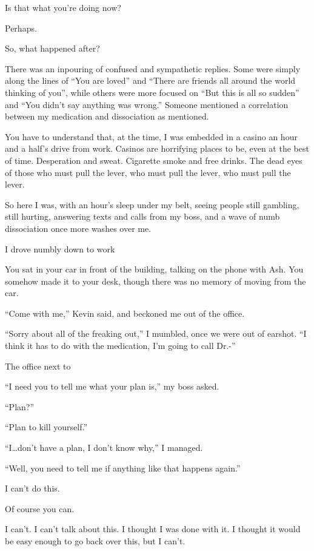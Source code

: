 \begin{paracol}{2}
\begin{leftcolumn}
\begin{ally}
Is that what you're doing now?
\end{ally}
Perhaps.
\newpage

\begin{ally}
So, what happened after?
\end{ally}
There was an inpouring of confused and sympathetic replies. Some were simply along the lines of ``You are loved'' and ``There are friends all around the world thinking of you'', while others were more focused on ``But this is all so sudden'' and ``You didn't say anything was wrong.'' Someone mentioned a correlation between my medication and dissociation as mentioned.

You have to understand that, at the time, I was embedded in a casino an hour and a half's drive from work. Casinos are horrifying places to be, even at the best of time. Desperation and sweat. Cigarette smoke and free drinks. The dead eyes of those who must pull the lever, who must pull the lever, who must pull the lever.

So here I was, with an hour's sleep under my belt, seeing people still gambling, still hurting, answering texts and calls from my boss, and a wave of numb dissociation once more washes over me.

I drove numbly down to work

\begin{ally}
You sat in your car in front of the building, talking on the phone with Ash. You somehow made it to your desk, though there was no memory of moving from the car.
\end{ally}
``Come with me,'' Kevin said, and beckoned me out of the office.

``Sorry about all of the freaking out,'' I mumbled, once we were out of earshot. ``I think it has to do with the medication, I'm going to call Dr.-''

\begin{ally}
The office next to
\end{ally}
``I need you to tell me what your plan is,'' my boss asked.

``Plan?''

``Plan to kill yourself.''

``I\ldots{}don't have a plan, I don't know why,'' I managed.

``Well, you need to tell me if anything like that happens again.''
\newpage

\noindent I can't do this.

\begin{ally}
Of course you can.
\end{ally}
I can't. I can't talk about this. I thought I was done with it. I thought it would be easy enough to go back over this, but I can't.


\end{leftcolumn}
\end{paracol}
